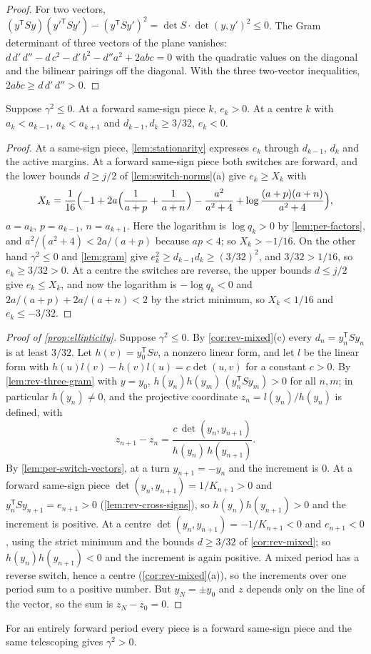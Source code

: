 \begin{proof}
For two vectors, $(y^{\mathsf T}Sy)(y'^{\mathsf T}Sy')-(y^{\mathsf T}Sy')^2=\det S\cdot\det(y,y')^2\le0$.
The Gram determinant of three vectors of the plane vanishes:
$d\,d'\,d''-d\,c^2-d'\,b^2-d''a^2+2abc=0$ with the quadratic values on the diagonal and the bilinear pairings off the diagonal. With the three two-vector
inequalities, $2abc\ge d\,d'\,d''>0$.
\end{proof}

\begin{lemma}\label{lem:rev-cross-signs}
Suppose $\gamma^2\le0$. At a forward same-sign piece $k$, $e_k>0$. At a centre $k$ with
$a_k<a_{k-1}$, $a_k<a_{k+1}$ and $d_{k-1},d_k\ge3/32$, $e_k<0$.
\end{lemma}

\begin{proof}
At a same-sign piece, \cref{lem:stationarity} expresses $e_k$ through $d_{k-1}$, $d_k$ and the
active margins. At a forward same-sign piece both switches are forward, and the lower bounds
$d\ge j/2$ of \cref{lem:switch-norms}(a) give $e_k\ge X_k$ with
\[
  X_k=\frac1{16}\Bigl(-1+2a\Bigl(\frac1{a+p}+\frac1{a+n}\Bigr)-\frac{a^2}{a^2+4}
  +\log\frac{(a+p)(a+n)}{a^2+4}\Bigr),
\]
$a=a_k$, $p=a_{k-1}$, $n=a_{k+1}$. Here the logarithm is $\log q_k>0$ by
\cref{lem:per-factors}, and $a^2/(a^2+4)<2a/(a+p)$ because $ap<4$; so $X_k>-1/16$. On the other
hand $\gamma^2\le0$ and \cref{lem:gram} give $e_k^2\ge d_{k-1}d_k\ge(3/32)^2$, and $3/32>1/16$, so
$e_k\ge3/32>0$. At a centre the switches are reverse, the upper bounds $d\le j/2$ give
$e_k\le X_k$, and now the logarithm is $-\log q_k<0$ and $2a/(a+p)+2a/(a+n)<2$ by the strict
minimum, so $X_k<1/16$ and $e_k\le-3/32$.
\end{proof}

\begin{proof}[Proof of \cref{prop:ellipticity}]
Suppose $\gamma^2\le0$. By \cref{cor:rev-mixed}(c) every $d_n=y_n^{\mathsf T}Sy_n$ is at least
$3/32$. Let $h(v)=y_0^{\mathsf T}Sv$, a nonzero linear form, and let $l$ be the linear form with
$h(u)l(v)-h(v)l(u)=c\det(u,v)$ for a constant $c>0$. By \cref{lem:rev-three-gram} with
$y=y_0$, $h(y_n)h(y_m)\,(y_n^{\mathsf T}Sy_m)>0$ for all $n,m$; in particular $h(y_n)\ne0$, and the
projective coordinate $z_n=l(y_n)/h(y_n)$ is defined, with
\[
  z_{n+1}-z_n=\frac{c\,\det(y_n,y_{n+1})}{h(y_n)\,h(y_{n+1})}.
\]
By \cref{lem:per-switch-vectors}, at a turn $y_{n+1}=-y_n$ and the increment is $0$. At a forward
same-sign piece $\det(y_n,y_{n+1})=1/K_{n+1}>0$ and $y_n^{\mathsf T}Sy_{n+1}=e_{n+1}>0$
(\cref{lem:rev-cross-signs}), so $h(y_n)h(y_{n+1})>0$ and the increment is positive. At a centre
$\det(y_n,y_{n+1})=-1/K_{n+1}<0$ and $e_{n+1}<0$, using the strict minimum and the bounds
$d\ge3/32$ of \cref{cor:rev-mixed}; so $h(y_n)h(y_{n+1})<0$ and the increment is again positive.
A mixed period has a reverse switch, hence a centre (\cref{cor:rev-mixed}(a)), so the increments
over one period sum to a positive number. But $y_N=\pm y_0$ and $z$ depends only on the line of
the vector, so the sum is $z_N-z_0=0$.
\end{proof}

For an entirely forward period every piece is a forward same-sign piece and the same telescoping gives
$\gamma^2>0$.
